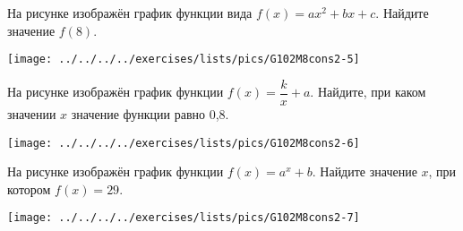 \begin{consultation}
\begin{listofex}
	\item 
		\begin{minipage}[t]{\bodywidth}
			На рисунке изображён график функции вида \( f(x)=ax^{2}+bx+c \). Найдите значение \( f(8) \).
		\end{minipage}
		\hspace{0.02\linewidth}
		\begin{minipage}[t]{\picwidth}
			\texttt{[image: ../../../../exercises/lists/pics/G102M8cons2-5]}
		\end{minipage}
	\item 
		\begin{minipage}[t]{\bodywidth}
			На рисунке изображён график функции \( f (x) =\dfrac{k}{x}+a \). Найдите, при каком значении \( x \) значение функции равно 0,8.
		\end{minipage}
		\hspace{0.02\linewidth}
		\begin{minipage}[t]{\picwidth}
			\texttt{[image: ../../../../exercises/lists/pics/G102M8cons2-6]}
		\end{minipage}
	\item 
		\begin{minipage}[t]{\bodywidth}
			На рисунке изображён график функции \( f(x) =a^{x}+b \). Найдите значение \( x \), при котором \( f(x)=29 \).
		\end{minipage}
		\hspace{0.02\linewidth}
		\begin{minipage}[t]{\picwidth}
			\texttt{[image: ../../../../exercises/lists/pics/G102M8cons2-7]}
		\end{minipage}
		
		
	\end{listofex}
\end{consultation}

